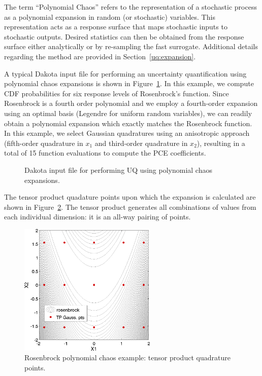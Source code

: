 The term ``Polynomial Chaos'' refers to the representation of a stochastic 
process as a polynomial expansion in random (or stochastic) variables. This 
representation acts as a response surface that maps stochastic inputs to 
stochastic outputs. Desired statistics can then be obtained from the 
response surface either analytically or by re-sampling the fast surrogate.
Additional details regarding the method are 
provided in Section~\ref{uq:expansion}.

A typical Dakota input file for performing an uncertainty
quantification using polynomial chaos expansions is shown in
Figure~\ref{uq:examples:pce_input}.
In this example, we compute CDF
probabilities for six response levels of Rosenbrock's function. Since
Rosenbrock is a fourth order polynomial and we employ a fourth-order
expansion using an optimal basis (Legendre for uniform random
variables), we can readily obtain a polynomial expansion which exactly
matches the Rosenbrock function. In this example, we select Gaussian
quadratures using an anisotropic approach (fifth-order quadrature in
$x_1$ and third-order quadrature in $x_2$), resulting in a total of
15 function evaluations to compute the PCE coefficients.

\begin{figure}
  \centering
  \begin{bigbox}
    \begin{small}
    \end{small}
  \end{bigbox}
\caption{Dakota input file for performing UQ using polynomial chaos expansions.}
\label{uq:examples:pce_input}
\end{figure}

The tensor product quadature points upon which the expansion is calculated 
are shown in Figure~\ref{uq:examples:rosen_pce_points}. 
The tensor product generates
all combinations of values from each individual dimension: it is an 
all-way pairing of points.

\begin{figure}[ht!]
  \centering
  \includegraphics[height=2.5in]{images/rosen_pce_pts}
  \caption{Rosenbrock polynomial chaos example: tensor product quadrature points.}
  \label{uq:examples:rosen_pce_points}
\end{figure}

